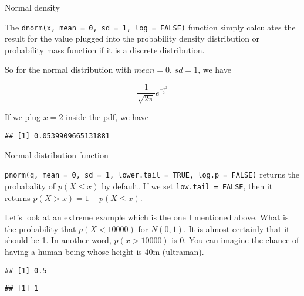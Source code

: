 \documentclass[ignorenonframetext,aspectratio=169]{beamer}
\begin{document}
\begin{frame}[fragile]{Normal density}
\protect\hypertarget{normal-density}{}

The \texttt{dnorm(x,\ mean\ =\ 0,\ sd\ =\ 1,\ log\ =\ FALSE)} function
simply calculates the result for the value plugged into the probability
density distribution or probability mass function if it is a discrete
distribution.

So for the normal distribution with \(mean=0\), \(sd=1\), we have

\[
\frac{1}{\sqrt{2\pi}}e^{\frac{-x^2}{2}}
\]

If we plug \(x = 2\) inside the pdf, we have

\begin{verbatim}
## [1] 0.0539909665131881
\end{verbatim}

\end{frame}

\begin{frame}[fragile]{Normal distribution function}
\protect\hypertarget{normal-distribution-function}{}

\texttt{pnorm(q,\ mean\ =\ 0,\ sd\ =\ 1,\ lower.tail\ =\ TRUE,\ log.p\ =\ FALSE)}
returns the probabality of \(p(X \leq x)\) by default. If we set
\texttt{low.tail\ =\ FALSE}, then it returns
\(p(X > x) = 1-p (X \leq x)\).

\end{frame}

\begin{frame}[fragile]{}
\protect\hypertarget{section-2}{}

Let's look at an extreme example which is the one I mentioned above.
What is the probability that \(p(X < 10000)\) for \(N(0,1)\). It is
almost certainly that it should be 1. In another word, \(p(x>10000)\) is
0. You can imagine the chance of having a human being whose height is
40m (ultraman).

\begin{verbatim}
## [1] 0.5
\end{verbatim}

\begin{verbatim}
## [1] 1
\end{verbatim}

\end{frame}
\end{document}
